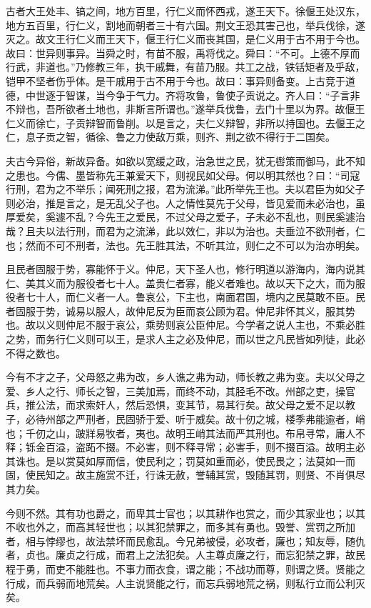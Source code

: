 \documentclass[]{article}
\begin{document}
古者大王处丰、镐之间，地方百里，行仁义而怀西戎，遂王天下。徐偃王处汉东，地方五百里，行仁义，割地而朝者三十有六国。荆文王恐其害己也，举兵伐徐，遂灭之。故文王行仁义而王天下，偃王行仁义而丧其国，是仁义用于古不用于今也。故曰：世异则事异。当舜之时，有苗不服，禹将伐之。舜曰：``不可。上德不厚而行武，非道也。''乃修教三年，执干戚舞，有苗乃服。共工之战，铁铦矩者及乎敌，铠甲不坚者伤乎体。是干戚用于古不用于今也。故曰：事异则备变。上古竞于道德，中世逐于智谋，当今争于气力。齐将攻鲁，鲁使子贡说之。齐人曰：``子言非不辩也，吾所欲者土地也，非斯言所谓也。''遂举兵伐鲁，去门十里以为界。故偃王仁义而徐亡，子贡辩智而鲁削。以是言之，夫仁义辩智，非所以持国也。去偃王之仁，息子贡之智，循徐、鲁之力使敌万乘，则齐、荆之欲不得行于二国矣。

夫古今异俗，新故异备。如欲以宽缓之政，治急世之民，犹无辔策而御马，此不知之患也。今儒、墨皆称先王兼爱天下，则视民如父母。何以明其然也？曰：``司寇行刑，君为之不举乐；闻死刑之报，君为流涕。''此所举先王也。夫以君臣为如父子则必治，推是言之，是无乱父子也。人之情性莫先于父母，皆见爱而未必治也，虽厚爱矣，奚遽不乱？今先王之爱民，不过父母之爱子，子未必不乱也，则民奚遽治哉？且夫以法行刑，而君为之流涕，此以效仁，非以为治也。夫垂泣不欲刑者，仁也；然而不可不刑者，法也。先王胜其法，不听其泣，则仁之不可以为治亦明矣。

且民者固服于势，寡能怀于义。仲尼，天下圣人也，修行明道以游海内，海内说其仁、美其义而为服役者七十人。盖贵仁者寡，能义者难也。故以天下之大，而为服役者七十人，而仁义者一人。鲁哀公，下主也，南面君国，境内之民莫敢不臣。民者固服于势，诚易以服人，故仲尼反为臣而哀公顾为君。仲尼非怀其义，服其势也。故以义则仲尼不服于哀公，乘势则哀公臣仲尼。今学者之说人主也，不乘必胜之势，而务行仁义则可以王，是求人主之必及仲尼，而以世之凡民皆如列徒，此必不得之数也。

今有不才之子，父母怒之弗为改，乡人谯之弗为动，师长教之弗为变。夫以父母之爱、乡人之行、师长之智，三美加焉，而终不动，其胫毛不改。州部之吏，操官兵，推公法，而求索奸人，然后恐惧，变其节，易其行矣。故父母之爱不足以教子，必待州部之严刑者，民固骄于爱、听于威矣。故十仞之城，楼季弗能逾者，峭也；千仞之山，跛牂易牧者，夷也。故明王峭其法而严其刑也。布帛寻常，庸人不释；铄金百溢，盗跖不掇。不必害，则不释寻常；必害手，则不掇百溢。故明主必其诛也。是以赏莫如厚而信，使民利之；罚莫如重而必，使民畏之；法莫如一而固，使民知之。故主施赏不迁，行诛无赦，誉辅其赏，毁随其罚，则贤、不肖俱尽其力矣。

今则不然。其有功也爵之，而卑其士官也；以其耕作也赏之，而少其家业也；以其不收也外之，而高其轻世也；以其犯禁罪之，而多其有勇也。毁誉、赏罚之所加者，相与悖缪也，故法禁坏而民愈乱。今兄弟被侵，必攻者，廉也；知友辱，随仇者，贞也。廉贞之行成，而君上之法犯矣。人主尊贞廉之行，而忘犯禁之罪，故民程于勇，而吏不能胜也。不事力而衣食，谓之能；不战功而尊，则谓之贤。贤能之行成，而兵弱而地荒矣。人主说贤能之行，而忘兵弱地荒之祸，则私行立而公利灭矣。
\end{document}
